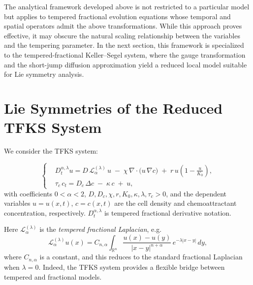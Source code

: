 \documentclass{article}
\begin{document}
\par 
The analytical framework developed above is not restricted to a particular model but applies to tempered fractional evolution equations whose temporal and spatial operators admit the above transformations. While this approach proves effective, it may obscure the natural scaling relationship between the variables and the tempering parameter. In the next section, this framework is specialized to the tempered-fractional Keller--Segel system, where the gauge transformation and the short-jump diffusion approximation yield a reduced local model suitable for Lie symmetry analysis.%
\section{Lie Symmetries of the Reduced TFKS System}\label{sec:lie_symmetries}
\par 
We consider the TFKS system:


\begin{equation}\label{eq:TFKS}
\begin{cases}
&D_t^{\alpha,\lambda}u = D\,\mathcal{L}^{(\lambda)}_{\alpha}\,u \;-\; \chi\,\nabla\!\cdot\!\big(u\,\nabla c\big)\;+\; r\,u\!\left(1-\frac{u}{K_0}\right),\\[2mm]
&\tau_c\,c_t = D_c\,\Delta c \;-\; \kappa\,c \;+\; u, 
\end{cases}
\end{equation}
with coefficients $0<\alpha<2$, $D,D_c,\chi,r,K_0,\kappa,\lambda,\tau_c>0$, and the dependent variables $u=u(x,t)$, $c=c(x,t)$ are the cell density and chemoattractant concentration, respectively. $D_t^{\alpha,\lambda}$ is tempered fractional derivative notation.
\par 
Here $\mathcal{L}^{(\lambda)}_{\alpha}$ is the \emph{tempered fractional Laplacian}, e.g.
\begin{equation}\label{eq:laplacian_nonlocal}
\mathcal{L}^{(\lambda)}_{\alpha}u(x)
= C_{n,\alpha}\int_{\mathbb{R}^n}\frac{u(x)-u(y)}{|x-y|^{n+\alpha}}\,e^{-\lambda|x-y|}\,dy,
\end{equation}
where $C_{n,\alpha}$ is a constant, and this reduces to the standard fractional Laplacian when $\lambda=0$. Indeed, the TFKS system provides a flexible bridge between tempered and fractional models.
\end{document}

